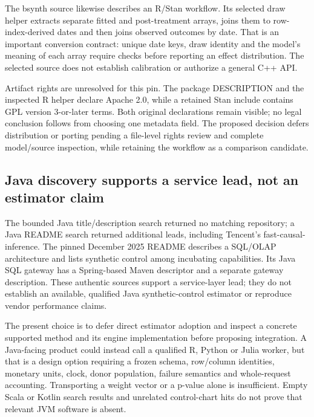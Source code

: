The bsynth source likewise describes an R/Stan workflow. Its selected draw
helper extracts separate fitted and post-treatment arrays, joins them to
row-index-derived dates and then joins observed outcomes by date. That is
an important conversion contract: unique date keys, draw identity and
the model's meaning of each array require checks before reporting an
effect distribution. The selected source does not establish calibration
or authorize a general C++ API.\citep{exec25_synthcross_bsynth}

Artifact rights are unresolved for this pin. The package DESCRIPTION and
the inspected R helper declare Apache 2.0, while a retained Stan include
contains GPL version 3-or-later terms. Both original declarations remain
visible; no legal conclusion follows from choosing one metadata field.
The proposed decision defers distribution or porting pending a file-level
rights review and complete model/source inspection, while retaining the
workflow as a comparison candidate.\citep{exec25_synthcross_bsynth}

\subsection{Java discovery supports a service lead, not an estimator claim}
The bounded Java title/description search returned no matching repository;
a Java README search returned additional leads, including Tencent's
fast-causal-inference. The pinned December 2025 README describes a SQL/OLAP
architecture and lists synthetic control among incubating capabilities.
Its Java SQL gateway has a Spring-based Maven descriptor and a separate
gateway description. These authentic sources support a service-layer lead;
they do not establish an available, qualified Java synthetic-control
estimator or reproduce vendor performance claims.\citep{exec25_synthcross_tencent}

The present choice is to defer direct estimator adoption and inspect a
concrete supported method and its engine implementation before proposing
integration. A Java-facing product could instead call a qualified R,
Python or Julia worker, but that is a design option requiring a frozen
schema, row/column identities, monetary units, clock, donor population,
failure semantics and whole-request accounting. Transporting a weight
vector or a p-value alone is insufficient. Empty Scala or Kotlin search
results and unrelated control-chart hits do not prove that relevant JVM
software is absent.\citep{exec25_synthcross_choice}

